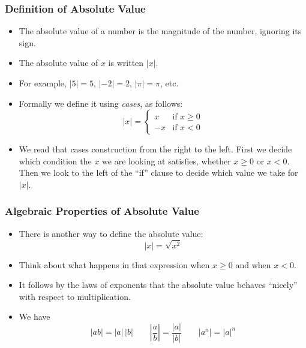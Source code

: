 \documentclass[serif,ignorenonframetext]{beamer}
\begin{document}
\begin{frame}
  \frametitle{Definition of Absolute Value}
  \begin{itemize}[<+->]
  \item The absolute value of a number is the magnitude of the number,
    ignoring its sign.
  \item The absolute value of $x$ is written $|x|$.
  \item For example, $|5|=5$, $|-2|=2$, $|\pi|=\pi$, etc.
  \item Formally we define it using \textit{cases}, as follows:
    \begin{equation*}
      |x| = \begin{cases}
         x & \mbox{if $x\ge 0$} \\
        -x & \mbox{if $x<0$}
      \end{cases}
    \end{equation*}
  \item We read that cases construction from the right to the left.
    First we decide which condition the $x$ we are looking at
    satisfies, whether $x\ge 0$ or $x<0$.  Then we look to the left of
    the ``if'' clause to decide which value we take for $|x|$.
  \end{itemize}
\end{frame}


\begin{frame}
  \frametitle{Algebraic Properties of Absolute Value}
  \begin{itemize}[<+->]
  \item There is another way to define the absolute value:
    \begin{equation*}
      |x| = \sqrt{x^2}
    \end{equation*}
  \item Think about what happens in that expression when $x\ge 0$ and
    when $x<0$.
  \item It follows by the laws of exponents that the absolute value
    behaves ``nicely'' with respect to multiplication.
  \item We have 
    \begin{equation*}
      |ab| = |a| \, |b| 
      \qquad \left|\frac{a}{b}\right| = \frac{|a|}{|b|}
      \qquad |a^n| = |a|^n
    \end{equation*}
  \end{itemize}
\end{frame}
\end{document}
